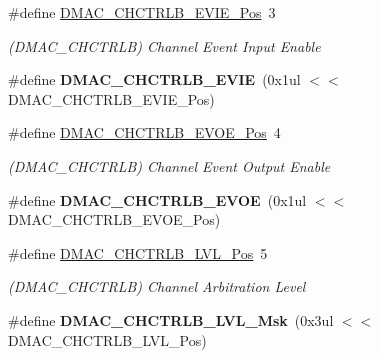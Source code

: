 \begin{DoxyCompactItemize}
\item 
\hypertarget{group___s_a_m_l21___d_m_a_c_ga770e9e8df9e5ffa4dbfcbe1bf0e1aca1}{}\#define \hyperlink{group___s_a_m_l21___d_m_a_c_ga770e9e8df9e5ffa4dbfcbe1bf0e1aca1}{D\+M\+A\+C\+\_\+\+C\+H\+C\+T\+R\+L\+B\+\_\+\+E\+V\+I\+E\+\_\+\+Pos}~3\label{group___s_a_m_l21___d_m_a_c_ga770e9e8df9e5ffa4dbfcbe1bf0e1aca1}

\begin{DoxyCompactList}\small\item\em (D\+M\+A\+C\+\_\+\+C\+H\+C\+T\+R\+L\+B) Channel Event Input Enable \end{DoxyCompactList}\item 
\hypertarget{group___s_a_m_l21___d_m_a_c_gacca87f7096b07b0b8b47af8cee7a82d8}{}\#define {\bfseries D\+M\+A\+C\+\_\+\+C\+H\+C\+T\+R\+L\+B\+\_\+\+E\+V\+I\+E}~(0x1ul $<$$<$ D\+M\+A\+C\+\_\+\+C\+H\+C\+T\+R\+L\+B\+\_\+\+E\+V\+I\+E\+\_\+\+Pos)\label{group___s_a_m_l21___d_m_a_c_gacca87f7096b07b0b8b47af8cee7a82d8}

\item 
\hypertarget{group___s_a_m_l21___d_m_a_c_gae44638b8cd2719d74b47ac7d6466574a}{}\#define \hyperlink{group___s_a_m_l21___d_m_a_c_gae44638b8cd2719d74b47ac7d6466574a}{D\+M\+A\+C\+\_\+\+C\+H\+C\+T\+R\+L\+B\+\_\+\+E\+V\+O\+E\+\_\+\+Pos}~4\label{group___s_a_m_l21___d_m_a_c_gae44638b8cd2719d74b47ac7d6466574a}

\begin{DoxyCompactList}\small\item\em (D\+M\+A\+C\+\_\+\+C\+H\+C\+T\+R\+L\+B) Channel Event Output Enable \end{DoxyCompactList}\item 
\hypertarget{group___s_a_m_l21___d_m_a_c_gae050cf0d770b987b351ac72f052d444c}{}\#define {\bfseries D\+M\+A\+C\+\_\+\+C\+H\+C\+T\+R\+L\+B\+\_\+\+E\+V\+O\+E}~(0x1ul $<$$<$ D\+M\+A\+C\+\_\+\+C\+H\+C\+T\+R\+L\+B\+\_\+\+E\+V\+O\+E\+\_\+\+Pos)\label{group___s_a_m_l21___d_m_a_c_gae050cf0d770b987b351ac72f052d444c}

\item 
\hypertarget{group___s_a_m_l21___d_m_a_c_ga4074cd8284b192e5d6fabcd787ced731}{}\#define \hyperlink{group___s_a_m_l21___d_m_a_c_ga4074cd8284b192e5d6fabcd787ced731}{D\+M\+A\+C\+\_\+\+C\+H\+C\+T\+R\+L\+B\+\_\+\+L\+V\+L\+\_\+\+Pos}~5\label{group___s_a_m_l21___d_m_a_c_ga4074cd8284b192e5d6fabcd787ced731}

\begin{DoxyCompactList}\small\item\em (D\+M\+A\+C\+\_\+\+C\+H\+C\+T\+R\+L\+B) Channel Arbitration Level \end{DoxyCompactList}\item 
\hypertarget{group___s_a_m_l21___d_m_a_c_ga9b4ec38104e2f4e3da42ea5a9e8bf48d}{}\#define {\bfseries D\+M\+A\+C\+\_\+\+C\+H\+C\+T\+R\+L\+B\+\_\+\+L\+V\+L\+\_\+\+Msk}~(0x3ul $<$$<$ D\+M\+A\+C\+\_\+\+C\+H\+C\+T\+R\+L\+B\+\_\+\+L\+V\+L\+\_\+\+Pos)\label{group___s_a_m_l21___d_m_a_c_ga9b4ec38104e2f4e3da42ea5a9e8bf48d}


\end{DoxyCompactItemize}
